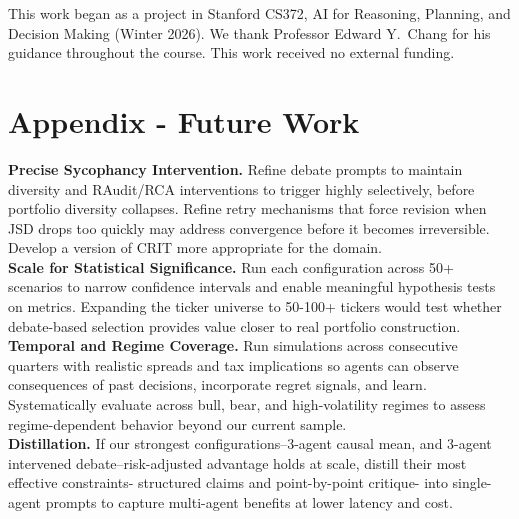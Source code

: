 \documentclass{article}
\begin{document}
\vspace{-6pt}
\begin{ack}
This work began as a project in Stanford CS372, AI for Reasoning, Planning, and Decision Making (Winter 2026). We thank Professor Edward Y.\ Chang for his guidance throughout the course. This work received no external funding.
\end{ack}
\newpage


\newpage
\appendix

\section{Appendix - Future Work}
\label{app:future-work}

\vspace{-0.01cm}
\vspace{-6pt}
\textbf{Precise Sycophancy Intervention.}
Refine debate prompts to maintain diversity and RAudit/RCA interventions to trigger highly selectively, before portfolio diversity collapses. Refine retry mechanisms that force revision when JSD drops too quickly may address convergence before it becomes irreversible. Develop a version of CRIT more appropriate for the domain.\\
\textbf{Scale for Statistical Significance.}
Run each configuration across 50+ scenarios to narrow confidence intervals and enable meaningful
hypothesis tests on metrics. Expanding the ticker universe to 50-100+ tickers would test whether debate-based selection provides value closer to real portfolio construction.\\
\textbf{Temporal and Regime Coverage.}
Run simulations across consecutive quarters with realistic spreads and tax implications so agents can observe consequences of past decisions, incorporate regret signals, and learn. Systematically evaluate across bull, bear, and high-volatility regimes
to assess regime-dependent behavior beyond our current sample.\\
\textbf{Distillation.}
If our strongest configurations--3-agent causal mean, and 3-agent intervened debate--risk-adjusted advantage holds at scale, distill their most effective
constraints- structured claims and point-by-point critique- into single-agent prompts to capture
multi-agent benefits at lower latency and cost.
\end{document}
